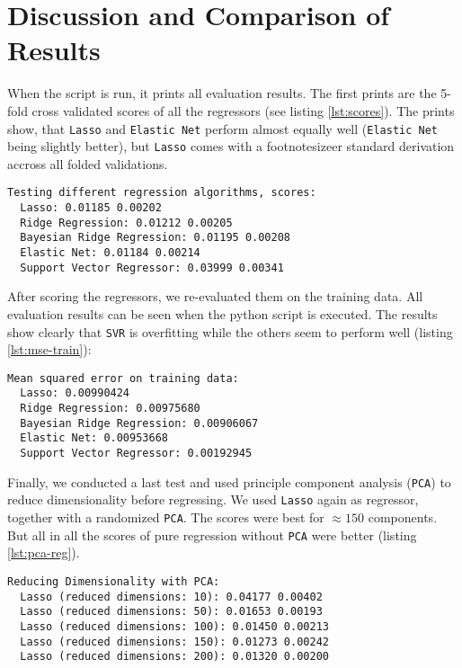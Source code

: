 \section{Discussion and Comparison of Results}

When the script is run, it prints all evaluation results. The first prints are the 5-fold cross validated scores of all the regressors (see listing \ref{lst:scores}). The prints show, that \texttt{Lasso} and \texttt{Elastic Net} perform almost equally well (\texttt{Elastic Net} being slightly better), but \texttt{Lasso} comes with a footnotesizeer standard derivation accross all folded validations.

\begin{lstlisting}[caption={Regression Scores},label={lst:scores},basicstyle=\footnotesize]
Testing different regression algorithms, scores:
  Lasso: 0.01185 0.00202
  Ridge Regression: 0.01212 0.00205
  Bayesian Ridge Regression: 0.01195 0.00208
  Elastic Net: 0.01184 0.00214
  Support Vector Regressor: 0.03999 0.00341
\end{lstlisting}

After scoring the regressors, we re-evaluated them on the training data. All evaluation results can be seen when the python script is executed. The results show clearly that \texttt{SVR} is overfitting while the others seem to perform well (listing \ref{lst:mse-train}):

\begin{lstlisting}[caption={Mean squared error on training data},label={lst:mse-train},basicstyle=\footnotesize]
Mean squared error on training data:
  Lasso: 0.00990424
  Ridge Regression: 0.00975680
  Bayesian Ridge Regression: 0.00906067
  Elastic Net: 0.00953668
  Support Vector Regressor: 0.00192945
\end{lstlisting}

Finally, we conducted a last test and used principle component analysis (\texttt{PCA}) to reduce dimensionality before regressing. We used \texttt{Lasso} again as regressor, together with a randomized \texttt{PCA}. The scores were best for $\approx 150$ components. But all in all the scores of pure regression without \texttt{PCA} were better (listing \ref{lst:pca-reg}).

\begin{lstlisting}[caption={PCA \& regression},label={lst:pca-reg},basicstyle=\footnotesize]
Reducing Dimensionality with PCA:
  Lasso (reduced dimensions: 10): 0.04177 0.00402
  Lasso (reduced dimensions: 50): 0.01653 0.00193
  Lasso (reduced dimensions: 100): 0.01450 0.00213
  Lasso (reduced dimensions: 150): 0.01273 0.00242
  Lasso (reduced dimensions: 200): 0.01320 0.00200
\end{lstlisting}

